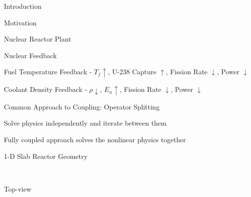 \documentclass{beamer}
\begin{document}
\begin{section}{Introduction}
\begin{frame}{Motivation}
\end{frame}
\begin{frame}{Nuclear Reactor Plant}
  \scalebox{0.5}{}
  \vfill
\end{frame}
\begin{frame}{Nuclear Feedback}
  \begin{center}
    \scalebox{0.4}{}
    \begin{itemize}
      \begin{scriptsize}
	\item Fuel Temperature Feedback -  $T_{f} \uparrow$, U-238 
	      Capture $\uparrow$, Fission Rate $\downarrow$, 
	      Power $\downarrow$
	\item Coolant Density Feedback - $\rho \downarrow$,
	      $E_{n} \uparrow$, Fission Rate $\downarrow$, 
	      Power $\downarrow$
      \end{scriptsize}
    \end{itemize}
  \end{center}
\end{frame}
\begin{frame}{Common Approach to Coupling: Operator Splitting}
\begin{customlist}{2ex}{0pt}
  \item Solve physics independently and iterate between them
  \begin{center}
    \scalebox{0.6}{}
  \end{center}
  \item Fully coupled approach solves the nonlinear physics together
  \begin{center}
    \scalebox{0.6}{}
  \end{center}
\end{customlist}
\end{frame}
\begin{frame}{1-D Slab Reactor Geometry}
\begin{columns}
  \begin{column}{0.5\textwidth}
  \begin{center}
    \scalebox{0.5}{}
    \\ Top-view

\end{center}
\end{column}
\end{columns}
\end{frame}
\end{section}
\end{document}
